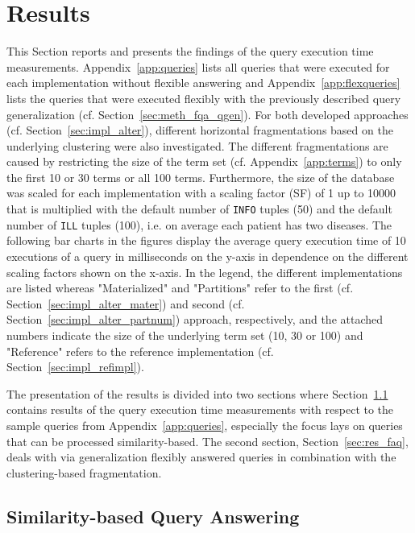 
\section{Results}
\label{sec:res}

This Section reports and presents the findings of the query execution time measurements. Appendix~\ref{app:queries} lists all queries that were executed
for each implementation without flexible answering and Appendix~\ref{app:flexqueries} lists the queries that were executed flexibly with the previously
described query generalization (cf. Section~\ref{sec:meth_fqa_qgen}). For both developed approaches (cf. Section~\ref{sec:impl_alter}), different horizontal
fragmentations based on the underlying clustering were also investigated. The different fragmentations are caused by restricting the size of the term set 
(cf. Appendix~\ref{app:terms}) to only the first 10 or 30 terms or all 100 terms. Furthermore, the size of the database was scaled for each implementation with
a scaling factor (SF) of 1 up to 10000 that is multiplied with the default number of \verb!INFO! tuples (50) and the default number of \verb!ILL! tuples (100),
i.e. on average each patient has two diseases.
The following bar charts in the figures display the average query execution time of 10 executions of a query in milliseconds on the y-axis in dependence on the
different scaling factors shown on the x-axis. In the legend, the different implementations are listed whereas "Materialized" and "Partitions" refer to the first
(cf. Section~\ref{sec:impl_alter_mater}) and second (cf. Section~\ref{sec:impl_alter_partnum}) approach, respectively, and the attached numbers indicate the size
of the underlying term set (10, 30 or 100) and "Reference" refers to the reference implementation (cf. Section~\ref{sec:impl_refimpl}). 

The presentation of the results is divided into two sections where Section~\ref{sec:res_sbqa} contains results of the query execution time measurements with 
respect to the sample queries from Appendix~\ref{app:queries}, especially the focus lays on queries that can be processed similarity-based. The second section,
Section~\ref{sec:res_faq}, deals with via generalization flexibly answered queries in combination with the clustering-based fragmentation.

\subsection{Similarity-based Query Answering}
\label{sec:res_sbqa}

